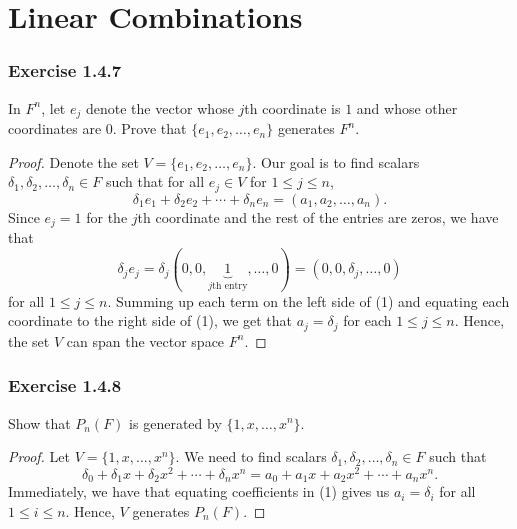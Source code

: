 \section{Linear Combinations}

\subsubsection{Exercise 1.4.7} In \( F^{n}  \), let \( e_{j}  \) denote the vector whose \( j \)th coordinate is \( 1  \) and whose other coordinates are 0. Prove that \( \{ e_{1}, e_{2}, \dots, e_{n} \}  \) generates \( F^{n} \).
\begin{proof}
Denote the set \( V = \{ e_{1}, e_{2}, \dots, e_{n} \}  \). Our goal is to find scalars \( \delta_{1}, \delta_{2} , \dots, \delta_{n} \in F  \) such that for all \( e_{j} \in V   \) for \( 1 \leq j \leq n  \), 
\[  \delta_{1} e_{1} + \delta_{2} e_{2} + \cdots + \delta_{n} e_{n} = (a_{1}, a_{2}, \dots, a_{n}). \tag{1} \]
Since \( e_{j} = 1  \) for the \( j \)th  coordinate and the rest of the entries are zeros, we have that 
\[  \delta_{j} e_{j} = \delta_{j} (0, 0, \underbrace{1}_{j\text{th entry} } , \dots, 0) = (0 , 0 , \delta_{j} , \dots , 0 ) \]  for all \( 1 \leq j \leq n  \).
Summing up each term on the left side of (1) and equating each coordinate to the right side of (1), we get that  \( a_{j} = \delta_{j}  \) for each \( 1 \leq j \leq n   \). Hence, the set \( V  \) can span the vector space \( F^{n}  \).

\end{proof}

\subsubsection{Exercise 1.4.8} Show that \( P_{n}(F) \) is generated by \( \{ 1 ,x , \dots , x^{n} \}  \).
\begin{proof}
Let \(  V = \{ 1 , x , \dots, x^{n} \}  \). We need to find scalars \( \delta_{1}, \delta_{2}, \dots, \delta_{n} \in F  \) such that 
\[ \delta_{0} + \delta_{1} x + \delta_{2} x^{2} + \cdots + \delta_{n} x^{n} = a_{0} + a_{1} x + a_{2} x^{2} + \cdots + a_{n} x^{n}.  \tag{1}       \]
Immediately, we have that equating coefficients in (1) gives us \( a_{i} = \delta_{i}  \) for all \( 1 \leq i \leq n  \). Hence, \( V  \) generates \( P_{n}(F) \). 
\end{proof}

